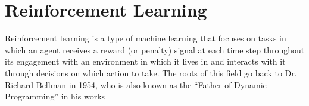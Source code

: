 \newpage\section{Reinforcement Learning}\label{sec:reinforcement_learning}

Reinforcement learning is a type of machine learning that focuses on tasks in which an agent receives a reward (or penalty) signal at each time step throughout its engagement with an environment in which it lives in and interacts with it through decisions on which action to take. The roots of this field go back to Dr. Richard Bellman in 1954, who is also known as the ``Father of Dynamic Programming'' in his works \cite{Bellman1954,Bellman1957a}




